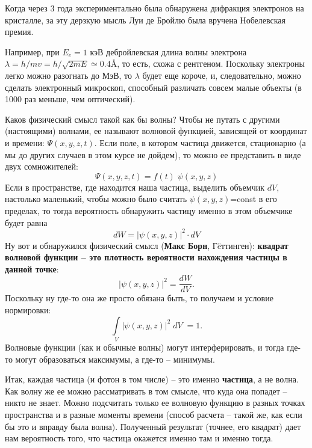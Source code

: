 Когда через 3 года экспериментально была обнаружена дифракция электронов на кристалле, за эту дерзкую мысль Луи де Бройлю была вручена Нобелевская премия.

Например, при $E_e=1$ кэВ дебройлевская длина волны электрона $\lambda=h/mv=h/\sqrt{2mE}\simeq0.4${\AA}, то есть, схожа с рентгеном. Поскольку электроны легко можно разогнать до МэВ, то $\lambda$ будет еще короче, и, следовательно, можно сделать электронный микроскоп, способный различать совсем малые объекты (в 1000 раз меньше, чем оптический).

Каков физический смысл такой как бы волны? Чтобы не путать с другими (настоящими) волнами, ее называют волновой функцией, зависящей от координат и времени: $\Psi(x,y,z,t)$. Если поле, в котором частица движется, стационарно (а мы до других случаев в этом курсе не дойдем), то можно ее представить в виде двух сомножителей:
\begin{displaymath}
\Psi(x,y,z,t)=f(t)\;\psi(x,y,z)
\end{displaymath}
Если в пространстве, где находится наша частица, выделить объемчик $dV$, настолько маленький, чтобы можно было считать $\psi(x,y,z)$=const в его пределах, то тогда вероятность обнаружить частицу именно в этом объемчике будет равна
\begin{displaymath}
dW=|\psi(x,y,z)|^2\cdot dV
\end{displaymath}
Ну вот и обнаружился физический смысл ({\bf Макс Борн}, Г\"{e}ттинген):  {\bf квадрат волновой функции -- это плотность вероятности нахождения частицы в данной точке}:
\begin{displaymath}
|\psi(x,y,z)|^2=\frac{dW}{dV}.
\end{displaymath}
Поскольку ну где-то она же просто обязана быть, то получаем и условие нормировки:
\begin{displaymath}
\int\limits_V|\psi(x,y,z)|^2\;dV\;=1.
\end{displaymath}
Волновые функции (как и обычные волны) могут интерферировать, и тогда где-то могут образоваться максимумы, а где-то -- минимумы.

Итак, каждая частица (и фотон в том числе) -- это именно {\bf частица}, а не волна. Как волну же ее можно рассматривать в том смысле, что куда она попадет -- никто не знает. Можно подсчитать только ее волновую функцию в разных точках пространства и в разные моменты времени (способ расчета -- такой же, как если бы это и вправду была волна). Полученный результат (точнее, его квадрат) дает нам вероятность того, что частица окажется именно там и именно тогда.

